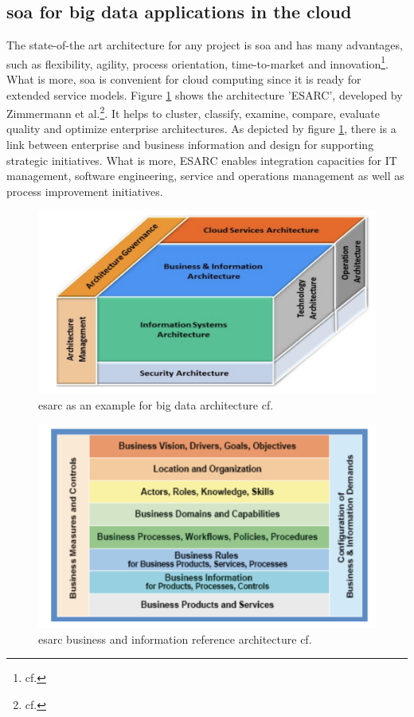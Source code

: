 \subsection{\ac{soa} for big data applications in the cloud}
The state-of-the art architecture for any project is \ac{soa} and has many advantages, such as flexibility, agility, process orientation, time-to-market and innovation\footnote{cf.\autocite{zimmermann}}. What is more, \ac{soa} is convenient for cloud computing since it is ready for extended service models.
Figure \ref{esarc_example} shows the architecture 'ESARC', developed by Zimmermann et al.\footnote{cf.\autocite{zimmermann}}. It helps to cluster, classify, examine, compare, evaluate quality and optimize enterprise architectures. As depicted by figure \ref{esarc_example}, there is a link between enterprise and business information and design for supporting strategic initiatives. What is more, ESARC enables integration capacities for \ac{IT} management, software engineering, service and operations management as well as process improvement initiatives.

\begin{figure}[htbp]
	\centering
	\includegraphics[width=1\textwidth]{images/esarc_cube.png}
	\caption{\ac{esarc} as an example for big data architecture cf.\autocite{zimmermann}}
	\label{esarc_example}
\end{figure}

\begin{figure}[htbp]
	\centering
	\includegraphics[width=1\textwidth]{images/esarc_business.png}
	\caption{\ac{esarc} business and information reference architecture cf.\autocite{zimmermann}}
	\label{vp_architecture}
\end{figure}


